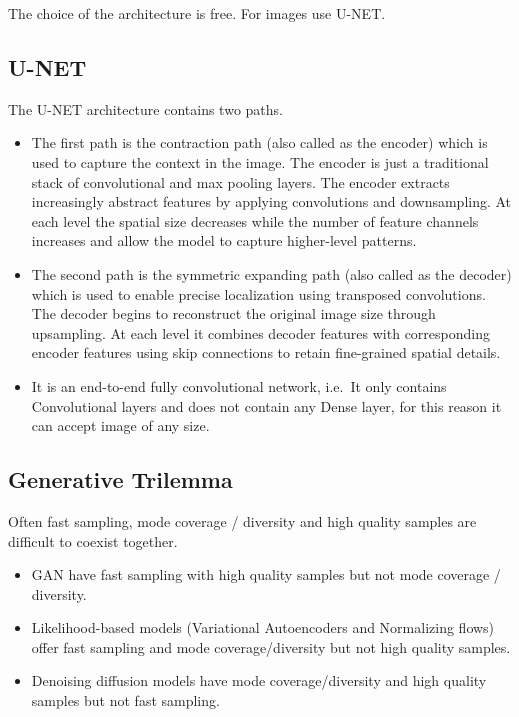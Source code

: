 \documentclass[11pt]{article}
\begin{document}
The choice of the architecture is free. For images use U-NET.

\subsection{U-NET}\label{u-net}

The U-NET architecture contains two paths.

\begin{itemize}
\tightlist
\item
  The first path is the contraction path (also called as the encoder)
  which is used to capture the context in the image. The encoder is just
  a traditional stack of convolutional and max pooling layers. The
  encoder extracts increasingly abstract features by applying
  convolutions and downsampling. At each level the spatial size
  decreases while the number of feature channels increases and allow the
  model to capture higher-level patterns.
\item
  The second path is the symmetric expanding path (also called as the
  decoder) which is used to enable precise localization using transposed
  convolutions. The decoder begins to reconstruct the original image
  size through upsampling. At each level it combines decoder features
  with corresponding encoder features using skip connections to retain
  fine-grained spatial details.
\item
  It is an end-to-end fully convolutional network, i.e.~It only contains
  Convolutional layers and does not contain any Dense layer, for this
  reason it can accept image of any size.
\end{itemize}

\subsection{Generative Trilemma}\label{generative-trilemma}

Often fast sampling, mode coverage / diversity and high quality samples
are difficult to coexist together.

\begin{itemize}
\tightlist
\item
  GAN have fast sampling with high quality samples but not mode coverage
  / diversity.
\item
  Likelihood-based models (Variational Autoencoders and Normalizing
  flows) offer fast sampling and mode coverage/diversity but not high
  quality samples.
\item
  Denoising diffusion models have mode coverage/diversity and high
  quality samples but not fast sampling.
\end{itemize}
\end{document}
